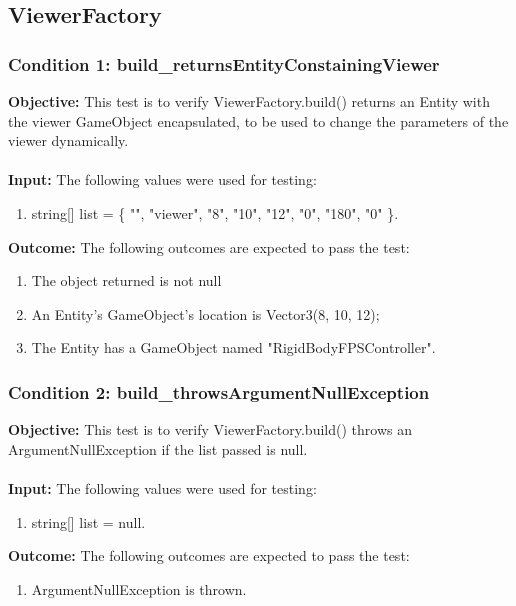 \documentclass[a4paper,12pt]{article}
\begin{document}
	\subsection{ViewerFactory}
		\subsubsection{Condition 1: build\_returnsEntityConstainingViewer}
			\textbf{Objective:} This test is to verify ViewerFactory.build() returns an Entity with the viewer GameObject encapsulated, to be used to change the parameters of the viewer dynamically.\\\\
			\textbf{Input:} The following values were used for testing:
				\begin{enumerate}
					\item string[] list = \{ "", "viewer", "8", "10", "12", "0", "180", "0" \}.
				\end{enumerate}
			\textbf{Outcome:} The following outcomes are expected to pass the test:
				\begin{enumerate}
					\item The object returned is not null
					\item An Entity's GameObject's location is Vector3(8, 10, 12);
					\item The Entity has a GameObject named "RigidBodyFPSController".
				\end{enumerate}
		\subsubsection{Condition 2: build\_throwsArgumentNullException}
			\textbf{Objective:} This test is to verify ViewerFactory.build() throws an ArgumentNullException if the list passed is null.\\\\
			\textbf{Input:} The following values were used for testing:
				\begin{enumerate}
					\item string[] list = null.
				\end{enumerate}
			\textbf{Outcome:} The following outcomes are expected to pass the test:
				\begin{enumerate}
					\item ArgumentNullException is thrown.
				\end{enumerate}
\end{document}
